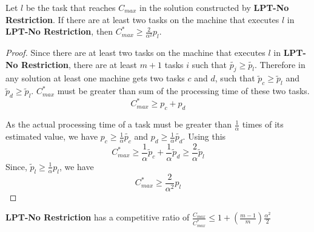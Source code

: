 \begin{lemma}\label{No Restriction}
  Let $l$ be the task that reaches $C_{max}$ in the solution
  constructed by \textbf{LPT-No Restriction}. If there are at least two
  tasks on the machine that executes $l$ in \textbf{LPT-No Restriction}, then 
  $C_{max}^* \geq {\frac{2}{\alpha^{2}}} p_l$.
\end{lemma}
\begin{proof}
  Since there are at least two tasks on the machine that executes $l$
  in \textbf{LPT-No Restriction}, there are at least $m+1$ tasks $i$
  such that $\tilde{p_j} \geq \tilde{p_l}$. Therefore in any solution
  at least one machine gets two tasks $c$ and $d$, such that $\tilde
  p_c \geq \tilde p_l$ and $\tilde p_d \geq \tilde p_l$. $C_{max}^{*}$
  must be greater than sum of the processing time of these two tasks.
   \begin{equation}\nonumber
    C_{max}^{*}\geq p_c + p_d
  \end{equation}	

  As the actual processing time of a task must be greater than  $\frac{1}{\alpha}$ times of its estimated value, we have $p_c \geq \frac{1}{\alpha}\tilde{p_c}$ and $p_d \geq \frac{1}{\alpha}\tilde{p_d}$. Using this
  \begin{equation}\nonumber 
    C_{max}^{*} \geq \frac{1}{\alpha}\tilde p_c +  \frac{1}{\alpha} \tilde p_d \geq \frac{2}{\alpha}\tilde p_l
  \end{equation}
Since, $\tilde p_l \geq \frac{1}{\alpha} p_l$, we have
  \begin{equation}\nonumber
    C_{max}^{*} \geq {\frac{2}{\alpha^{2}}} p_l 
  \end{equation}
\end{proof}

\begin{theorem}
  \label{th:strategy2}
  \textbf{LPT-No Restriction} has a competitive ratio of
  $\frac{C_{max}}{C_{max}^{*}} \leq 1 + (\frac{m-1}{m})
  \frac{\alpha^{2}}{2}$
\end{theorem} 

